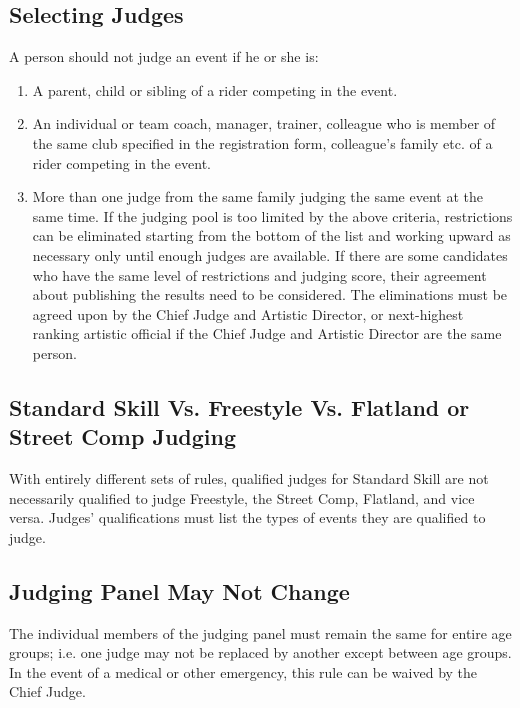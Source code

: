 \subsection{Selecting Judges}
A person should not judge an event if he or she is:\\
\begin{enumerate}
\item A parent, child or sibling of a rider competing in the event.
\item An individual or team coach, manager, trainer, colleague who is member of the same club specified in the registration form, colleague’s family etc. of a rider competing in the event.
\item More than one judge from the same family judging the same event at the same time. 
If the judging pool is too limited by the above criteria, restrictions can be eliminated starting from the bottom of the list
and working upward as necessary only until enough judges are available. If there are some candidates who have the same level of restrictions and judging score, their agreement about publishing the results need to be considered. The eliminations must be agreed upon by the Chief Judge and Artistic Director, or next-highest ranking artistic official if the Chief Judge and Artistic Director are the same person.
\end{enumerate}

\subsection{Standard Skill Vs. Freestyle Vs. Flatland or Street Comp Judging}
With entirely different sets of rules, qualified judges for Standard Skill are not necessarily qualified to judge Freestyle, the Street Comp, Flatland, and vice versa. Judges' qualifications must list the types of events they are qualified to judge.

\subsection{Judging Panel May Not Change}
The individual members of the judging panel must remain the same for entire age groups; i.e. one judge may not be replaced by another except between age groups. In the event of a medical or other emergency, this rule can be waived by the Chief Judge.

